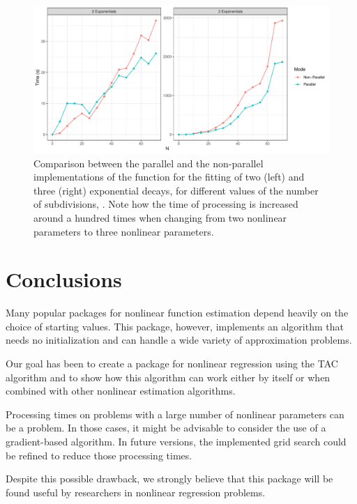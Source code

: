 \begin{figure}[htb]
    \centering
    \includegraphics[width=0.9\linewidth]{benchmark23}
    \caption{Comparison between the parallel and the non-parallel implementations of the  function for the fitting of two (left) and three (right) exponential decays, for different values of the number of subdivisions, . Note how the time of processing is increased around a hundred times when changing from two nonlinear parameters to three nonlinear parameters.}
    \label{fig:bench23}
\end{figure}

\section{Conclusions}
Many popular packages for nonlinear function estimation depend heavily on the choice of starting values. This package, however, implements an algorithm that needs no initialization and can handle a wide variety of approximation problems.

Our goal has been to create a package for nonlinear regression using the TAC algorithm and to show how this algorithm can work either by itself or when combined with other nonlinear estimation algorithms. 

Processing times on problems with a large number of nonlinear parameters can be a problem. In those cases, it might be advisable to consider the use of a gradient-based algorithm. In future versions, the implemented grid search could be refined to reduce those processing times.

Despite this possible drawback, we strongly believe that this package will be found useful by researchers in nonlinear regression problems.





